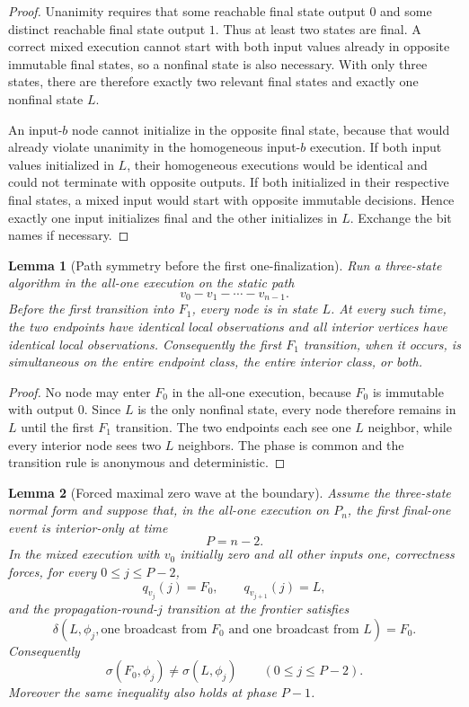 \documentclass[11pt]{article}
\newtheorem{lemma}{Lemma}
\theoremstyle{remark}
\newcommand{\Fzero}{F_0}
\newcommand{\Fone}{F_1}
\newcommand{\Live}{L}
\begin{document}
\begin{proof}
Unanimity requires that some reachable final state output $0$ and some distinct
reachable final state output $1$.  Thus at least two states are final.
A correct mixed execution cannot start with both input values already in opposite
immutable final states, so a nonfinal state is also necessary.  With only three
states, there are therefore exactly two relevant final states and exactly one
nonfinal state $\Live$.

An input-$b$ node cannot initialize in the opposite final state, because that would
already violate unanimity in the homogeneous input-$b$ execution.  If both input
values initialized in $\Live$, their homogeneous executions would be identical and
could not terminate with opposite outputs.  If both initialized in their respective
final states, a mixed input would start with opposite immutable decisions.
Hence exactly one input initializes final and the other initializes in $\Live$.
Exchange the bit names if necessary.
\end{proof}

\begin{lemma}[Path symmetry before the first one-finalization]
Run a three-state algorithm in the all-one execution on the static path
\[
v_0-v_1-\cdots-v_{n-1}.
\]
Before the first transition into $\Fone$, every node is in state $\Live$.
At every such time, the two endpoints have identical local observations and all
interior vertices have identical local observations.  Consequently the first
$\Fone$ transition, when it occurs, is simultaneous on the entire endpoint class,
the entire interior class, or both.
\end{lemma}

\begin{proof}
No node may enter $\Fzero$ in the all-one execution, because $\Fzero$ is immutable
with output $0$.  Since $\Live$ is the only nonfinal state, every node therefore
remains in $\Live$ until the first $\Fone$ transition.  The two endpoints each see
one $\Live$ neighbor, while every interior node sees two $\Live$ neighbors.
The phase is common and the transition rule is anonymous and deterministic.
\end{proof}


\begin{lemma}[Forced maximal zero wave at the boundary]
Assume the three-state normal form and suppose that, in the all-one execution
on $P_n$, the first final-one event is interior-only at time
\[
P=n-2.
\]
In the mixed execution with $v_0$ initially zero and all other inputs one,
correctness forces, for every $0\le j\le P-2$,
\[
q_{v_j}(j)=\Fzero,
\qquad
q_{v_{j+1}}(j)=\Live,
\]
and the propagation-round-$j$ transition at the frontier satisfies
\[
\delta\!\left(
\Live,\phi_j,
\text{one broadcast from }\Fzero
\text{ and one broadcast from }\Live
\right)=\Fzero.
\]
Consequently
\[
\sigma(\Fzero,\phi_j)\ne\sigma(\Live,\phi_j)
\qquad(0\le j\le P-2).
\]
Moreover the same inequality also holds at phase $P-1$.
\end{lemma}
\end{document}
